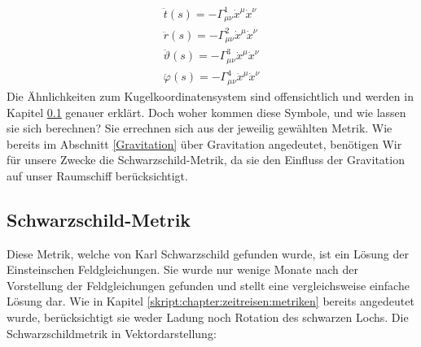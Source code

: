 \begin{refsection}
	\begin{align*}
	\ddot{t}(s) = -\Gamma^{1}_{\mu\nu}\dot{x}^{\mu}\dot{x}^{\nu}\\
	\ddot{r}(s) = -\Gamma^{2}_{\mu\nu}\dot{x}^{\mu}\dot{x}^{\nu}\\
	\ddot{\vartheta}(s) = -\Gamma^{3}_{\mu\nu}\dot{x}^{\mu}\dot{x}^{\nu}\\
	\ddot{\varphi}(s) = -\Gamma^{4}_{\mu\nu}\dot{x}^{\mu}\dot{x}^{\nu}		
	\end{align*}\label{skript:chapter:zeitreisen:geodaeten4dim}
	Die Ähnlichkeiten zum Kugelkoordinatensystem sind offensichtlich und werden in Kapitel \ref{Schwarzschild-Metrik} genauer erklärt.
	Doch woher kommen diese Symbole, und wie lassen sie sich berechnen?
	Sie errechnen sich aus der jeweilig gewählten Metrik. 
	Wie bereits im Abschnitt \ref{Gravitation} über Gravitation angedeutet, benötigen Wir für unsere Zwecke die Schwarzschild-Metrik, da sie den Einfluss der Gravitation auf unser Raumschiff berücksichtigt. 

	\subsection{Schwarzschild-Metrik}\label{Schwarzschild-Metrik}
	
	Diese Metrik, welche von Karl Schwarzschild gefunden wurde, ist ein Lösung der Einsteinschen Feldgleichungen. Sie wurde nur wenige Monate nach der Vorstellung der Feldgleichungen gefunden und stellt eine vergleichsweise einfache Lösung dar. Wie in Kapitel \ref{skript:chapter:zeitreisen:metriken} bereits angedeutet wurde, berücksichtigt sie weder Ladung noch Rotation des schwarzen Lochs. 
	Die Schwarzschildmetrik in Vektordarstellung:
	

\end{refsection}
